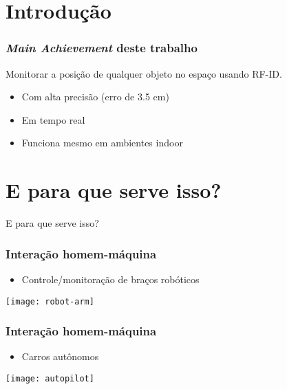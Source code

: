\section{Introdução}

\begin{frame}
  \frametitle{\emph{Main Achievement} deste trabalho}

    Monitorar a posição de qualquer objeto no espaço usando RF-ID.

    \begin{itemize}
      \item Com \alert{alta precisão} (erro de 3.5 cm)
      \item Em \alert{tempo real}
      \item Funciona mesmo em ambientes \alert{indoor}
    \end{itemize}
\end{frame}

\section{E para que serve isso?}

\begin{frame}
  \begin{center}
    \Huge E para que serve isso?
  \end{center}
\end{frame}

\begin{frame}
  \frametitle{Interação homem-máquina}
  \begin{itemize}
    \item  Controle/monitoração de braços robóticos
  \end{itemize}

  \begin{center}
    \texttt{[image: robot-arm]}
  \end{center}
\end{frame}

\begin{frame}
  \frametitle{Interação homem-máquina}
  \begin{itemize}
    \item  Carros autônomos
  \end{itemize}

  \begin{center}
    \texttt{[image: autopilot]}
  \end{center}
\end{frame}

